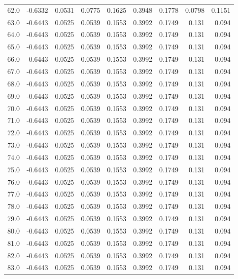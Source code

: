 \begin{longtable}{lrrrrrrrr}
62.0 & -0.6332 & 0.0531 & 0.0775 & 0.1625 & 0.3948 & 0.1778 & 0.0798 & 0.1151 \\
63.0 & -0.6443 & 0.0525 & 0.0539 & 0.1553 & 0.3992 & 0.1749 & 0.131 & 0.094 \\
64.0 & -0.6443 & 0.0525 & 0.0539 & 0.1553 & 0.3992 & 0.1749 & 0.131 & 0.094 \\
65.0 & -0.6443 & 0.0525 & 0.0539 & 0.1553 & 0.3992 & 0.1749 & 0.131 & 0.094 \\
66.0 & -0.6443 & 0.0525 & 0.0539 & 0.1553 & 0.3992 & 0.1749 & 0.131 & 0.094 \\
67.0 & -0.6443 & 0.0525 & 0.0539 & 0.1553 & 0.3992 & 0.1749 & 0.131 & 0.094 \\
68.0 & -0.6443 & 0.0525 & 0.0539 & 0.1553 & 0.3992 & 0.1749 & 0.131 & 0.094 \\
69.0 & -0.6443 & 0.0525 & 0.0539 & 0.1553 & 0.3992 & 0.1749 & 0.131 & 0.094 \\
70.0 & -0.6443 & 0.0525 & 0.0539 & 0.1553 & 0.3992 & 0.1749 & 0.131 & 0.094 \\
71.0 & -0.6443 & 0.0525 & 0.0539 & 0.1553 & 0.3992 & 0.1749 & 0.131 & 0.094 \\
72.0 & -0.6443 & 0.0525 & 0.0539 & 0.1553 & 0.3992 & 0.1749 & 0.131 & 0.094 \\
73.0 & -0.6443 & 0.0525 & 0.0539 & 0.1553 & 0.3992 & 0.1749 & 0.131 & 0.094 \\
74.0 & -0.6443 & 0.0525 & 0.0539 & 0.1553 & 0.3992 & 0.1749 & 0.131 & 0.094 \\
75.0 & -0.6443 & 0.0525 & 0.0539 & 0.1553 & 0.3992 & 0.1749 & 0.131 & 0.094 \\
76.0 & -0.6443 & 0.0525 & 0.0539 & 0.1553 & 0.3992 & 0.1749 & 0.131 & 0.094 \\
77.0 & -0.6443 & 0.0525 & 0.0539 & 0.1553 & 0.3992 & 0.1749 & 0.131 & 0.094 \\
78.0 & -0.6443 & 0.0525 & 0.0539 & 0.1553 & 0.3992 & 0.1749 & 0.131 & 0.094 \\
79.0 & -0.6443 & 0.0525 & 0.0539 & 0.1553 & 0.3992 & 0.1749 & 0.131 & 0.094 \\
80.0 & -0.6443 & 0.0525 & 0.0539 & 0.1553 & 0.3992 & 0.1749 & 0.131 & 0.094 \\
81.0 & -0.6443 & 0.0525 & 0.0539 & 0.1553 & 0.3992 & 0.1749 & 0.131 & 0.094 \\
82.0 & -0.6443 & 0.0525 & 0.0539 & 0.1553 & 0.3992 & 0.1749 & 0.131 & 0.094 \\
83.0 & -0.6443 & 0.0525 & 0.0539 & 0.1553 & 0.3992 & 0.1749 & 0.131 & 0.094 \\

\end{longtable}
